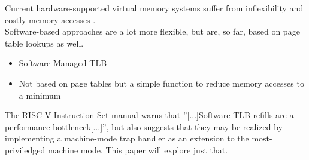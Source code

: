 
Current hardware-supported virtual memory systems suffer from inflexibility and costly memory accesses \cite{jacob1998look}.\\
Software-based approaches are a lot more flexible, but are, so far, based on page table lookups as well.


\begin{itemize}
    \item Software Managed TLB
    \item Not based on page tables but a simple function to reduce memory accesses to a minimum
\end{itemize}


The RISC-V Instruction Set manual warns that ''[...]Software TLB refills are a performance bottleneck[...]''\cite{RISCVInstructionSet},
but also suggests that they may be realized by implementing a machine-mode trap handler as an extension to the
most-priviledged machine mode. This paper will explore just that.








